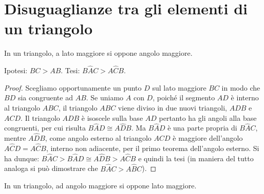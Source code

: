 \section{Disuguaglianze tra gli elementi di un 
	triangolo}\label{sect:disuguaglianze_triangoli}

\begin{teorema}
	In un triangolo, a lato maggiore si oppone angolo maggiore.
\end{teorema}

\noindent\begin{minipage}{0.7\textwidth}
	\noindent Ipotesi: $BC>AB$. Tesi: $B\widehat{A}C>A\widehat{C}B$.
	
	\begin{proof}
		Scegliamo opportunamente un punto $D$ sul lato maggiore $BC$ in modo 
		che $BD$ sia congruente ad $AB$. Se uniamo $A$ con $D$, poiché il 
		segmento $AD$ è interno al triangolo $ABC$, il triangolo $ABC$ viene 
		diviso in due nuovi triangoli, $ADB$ e $ACD$. Il triangolo $ADB$ è 
		isoscele sulla base $AD$ pertanto ha gli angoli alla base congruenti, 
		per cui risulta $B\widehat{A}D\cong A\widehat{D}B$. Ma 
		$B\widehat{A}D$ è una parte propria di $B\widehat{A}C$, mentre 
		$A\widehat{D}B$, come angolo esterno al triangolo $ACD$ è maggiore 
		dell'angolo $A\widehat{C}D=A\widehat{C}B$, interno non adiacente, per 
		il primo teorema dell'angolo esterno. Si ha dunque: 
		$B\widehat{A}C>B\widehat{A}D\cong A\widehat{D}B>A\widehat{C}B$ e 
		quindi la tesi (in maniera del tutto analoga si può dimostrare che 
		$B\widehat{A}C>A\widehat{B}C$).
	\end{proof}
\end{minipage}\hfil
\begin{minipage}{0.3\textwidth}
	\centering
\end{minipage}

\begin{teorema}
	In un triangolo, ad angolo maggiore si oppone lato maggiore.
\end{teorema}

